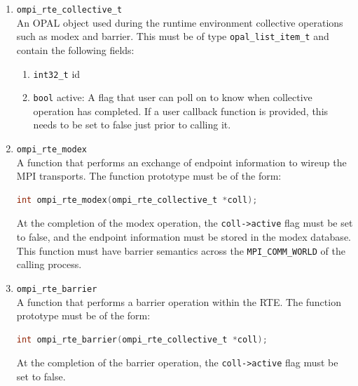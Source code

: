 \begin{enumerate}
\item \verb|ompi_rte_collective_t|\\
  An OPAL object used during the runtime environment collective operations such as modex and barrier. This must be of type \verb|opal_list_item_t| and contain the following fields:
  
  \begin{enumerate}
  \item \verb|int32_t| id
  \item \verb|bool| active: A flag that user can poll on to know when collective operation has completed. If a user callback function is provided, this needs to be set to false just prior to calling it.
  \end{enumerate}

\item \verb|ompi_rte_modex|\\
  A function that performs an exchange of endpoint information to wireup the MPI transports. The function prototype must be of the form:
  \begin{lstlisting}[language=C]
  int ompi_rte_modex(ompi_rte_collective_t *coll);
  \end{lstlisting}
  At the completion of the modex operation, the \verb|coll->active| flag must be set to false, and the endpoint information must be stored in the modex database.
  This function must have barrier semantics across the \verb|MPI_COMM_WORLD| of the calling process.

\item \verb|ompi_rte_barrier|\\
  A function that performs a barrier operation within the RTE. The function prototype must be of the form:
  \begin{lstlisting}[language=C]
  int ompi_rte_barrier(ompi_rte_collective_t *coll);
  \end{lstlisting}
  At the completion of the barrier operation, the \verb|coll->active| flag must be set to false.
\end{enumerate}


\iffalse

